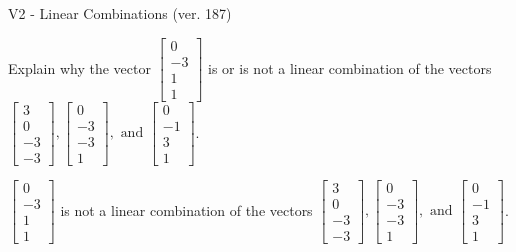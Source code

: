 \begin{exercise}
  \begin{exerciseTitle}V2 - Linear Combinations (ver. 187)\end{exerciseTitle}
  \begin{exerciseStatement}
    Explain why the vector \(\left[\begin{array}{c}
0 \\
-3 \\
1 \\
1
\end{array}\right]\)  is or is not a linear 
	combination of the vectors \(\left[\begin{array}{c}
3 \\
0 \\
-3 \\
-3
\end{array}\right] , \left[\begin{array}{c}
0 \\
-3 \\
-3 \\
1
\end{array}\right] , \text{ and } \left[\begin{array}{c}
0 \\
-1 \\
3 \\
1
\end{array}\right]\).
	


  \end{exerciseStatement}
  \begin{exerciseAnswer}
   \(\left[\begin{array}{c}
0 \\
-3 \\
1 \\
1
\end{array}\right]\) 
  	 is not  
	a linear combination of the vectors \(\left[\begin{array}{c}
3 \\
0 \\
-3 \\
-3
\end{array}\right] , \left[\begin{array}{c}
0 \\
-3 \\
-3 \\
1
\end{array}\right] , \text{ and } \left[\begin{array}{c}
0 \\
-1 \\
3 \\
1
\end{array}\right]\).

	
  


  \end{exerciseAnswer}
\end{exercise}